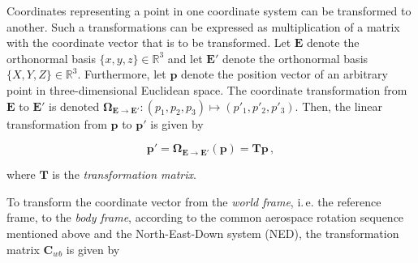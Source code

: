 Coordinates representing a point in one coordinate system can be transformed to another. Such a transformations can be expressed as multiplication of a matrix with the coordinate vector that is to be transformed. Let $\mathbf{E}$ denote the orthonormal basis $\{x, y, z\} \in \mathbb{R}^3$ and let $\mathbf{E}'$ denote the orthonormal basis $\{X, Y, Z\} \in \mathbb{R}^3$. Furthermore, let $\mathbf{p}$ denote the position vector of an arbitrary point in three-dimensional Euclidean space. The coordinate transformation from $\mathbf{E}$ to $\mathbf{E}'$ is denoted $\bm{\Omega}_{\mathbf{E} \rightarrow \mathbf{E}'}: (p_1, p_2, p_3) \mapsto (p'_1, p'_2, p'_3)$. Then, the linear transformation from $\mathbf{p}$ to $\mathbf{p}'$ is given by

\begin{equation}\label{eq:transformation}
  \mathbf{p'} = \bm{\Omega}_{\mathbf{E} \rightarrow \mathbf{E}'}(\mathbf{p}) = \mathbf{T} \mathbf{p}\,,
\end{equation}

\noindent
where $\mathbf{T}$ is the \emph{transformation matrix}.

To transform the coordinate vector from the \emph{world frame}, i.\,e. the reference frame, to the \emph{body frame}, according to the common aerospace rotation sequence mentioned above and the North-East-Down system (NED), the transformation matrix $\mathbf{C}_{wb}$ is given by

